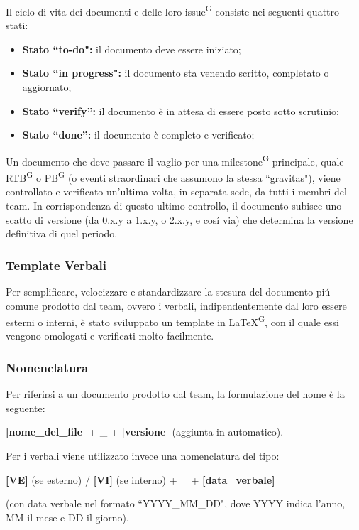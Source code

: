\documentclass[8pt]{article}
\newcommand{\glossterm}[1]{#1\textsuperscript{G}} %
\begin{document}
    Il ciclo di vita dei documenti e delle loro \glossterm{issue} consiste nei seguenti quattro stati:
\begin{itemize} 
    \item \textbf{Stato ``to-do":} il documento deve essere iniziato;
    \item \textbf{Stato ``in progress":} il documento sta venendo scritto, completato o aggiornato;
    \item \textbf{Stato ``verify'':} il documento è in attesa di essere posto sotto scrutinio;
    \item \textbf{Stato ``done'':} il documento è completo e verificato;
\end{itemize}
Un documento che deve passare il vaglio per una \glossterm{milestone} principale, quale \glossterm{RTB} o \glossterm{PB} (o eventi straordinari che assumono la stessa ``gravitas"), viene controllato e verificato un'ultima volta, in separata sede, da tutti i membri del team.
In corrispondenza di questo ultimo controllo, il documento subisce uno scatto di versione (da 0.x.y a 1.x.y, o 2.x.y, e cosí via) che determina la versione definitiva di quel periodo.

\subsubsection{Template Verbali}
Per semplificare, velocizzare e standardizzare la stesura del documento piú comune prodotto dal
team, ovvero i verbali, indipendentemente dal loro essere esterni o interni, è stato sviluppato un template in \glossterm{\LaTeX}, con il quale essi vengono omologati e verificati molto facilmente.
\subsubsection{Nomenclatura}
Per riferirsi a un documento prodotto dal team, la formulazione del nome è la seguente:
\begin{center}
\textbf{[nome\_del\_file]} + \_ + \textbf{[versione]} (aggiunta in automatico). 
\end{center}
Per i verbali viene utilizzato invece una nomenclatura del tipo:
\begin{center}
\textbf{[VE]} (se esterno) / \textbf{[VI]} (se interno) + \_ + \textbf{[data\_verbale]}
\end{center}
(con data verbale nel formato ``YYYY\_MM\_DD", dove YYYY indica l'anno, MM il mese e DD il giorno). 
\end{document}
